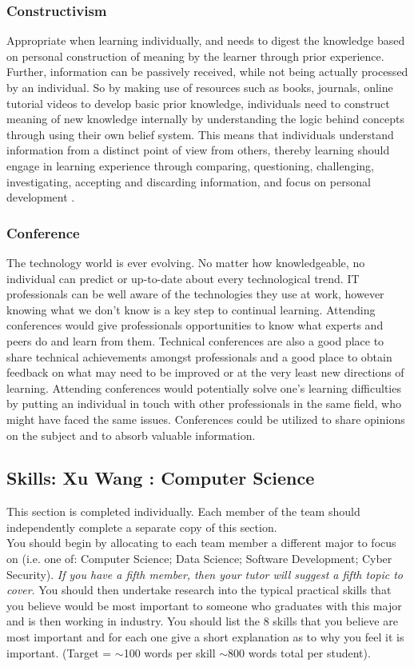 \documentclass[a4paper, 11pt]{report}
\begin{document}
\subsubsection{Constructivism}
 Appropriate when learning individually, and needs to digest the knowledge based on personal construction of meaning by the learner through prior experience. Further, information can be passively received, while not being actually processed by an individual. So by making use of resources such as books, journals, online tutorial videos to develop basic prior knowledge, individuals need to construct meaning of new knowledge internally by understanding the logic behind concepts through using their own belief system. This means that individuals understand information from a distinct point of view from others, thereby learning should engage in learning experience through comparing, questioning, challenging, investigating, accepting and discarding information, and focus on personal development \cite{cooperstein2004beyond}.

 
\subsubsection{Conference}
The technology world is ever evolving. No matter how knowledgeable, no individual can predict or up-to-date about every technological trend. IT professionals can be well aware of the technologies they use at work, however knowing what we don’t know is a key step to continual learning. Attending conferences would give professionals opportunities to know what experts and peers do and learn from them. Technical conferences are also a good place to share technical achievements amongst professionals and a good place to obtain feedback on what may need to be improved or at the very least new directions of learning. Attending conferences would potentially solve one’s learning difficulties by putting an individual in touch with other professionals in the same field, who might have faced the same issues. Conferences could be utilized to share opinions on the subject and to absorb valuable information.



\subsection{Skills: Xu Wang : Computer Science}

This section is completed individually. Each member of the team should independently complete a separate copy of this section.\\
You should begin by allocating to each team member a different major to focus on (i.e. one of: Computer Science; Data Science; Software Development; Cyber Security). \textit{If you have a fifth member, then your tutor will suggest a fifth topic to cover}. You should then undertake research into the typical practical skills that you believe would be most important to someone who graduates with this major and is then working in industry. You should list the 8 skills that you believe are most important and for each one give a short explanation as to why you feel it is important. (Target = $\sim$100 words per skill $\sim$800 words total per student).\\
\end{document}
